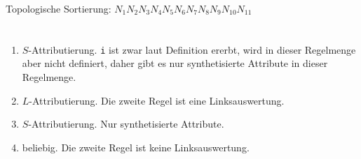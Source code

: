 \documentclass[a4paper,10pt]{scrartcl}
\begin{document}
\begin{enumerate}
\begin{center}
{{{{                            
                        }
                    }
                }
                \Tr{$+$}
            }
        \end{center}
        Topologische Sortierung: $N_1N_2N_3N_4N_5N_6N_7N_8N_9N_{10}N_{11}$
\end{enumerate}

\section{}
\begin{enumerate}
\item   $S$-Attributierung. \texttt{i} ist zwar laut Definition ererbt, wird in dieser Regelmenge aber nicht definiert, daher gibt es nur synthetisierte Attribute in dieser Regelmenge.
\item   $L$-Attributierung. Die zweite Regel ist eine Linksauswertung.
\item   $S$-Attributierung. Nur synthetisierte Attribute.
\item   beliebig. Die zweite Regel ist keine Linksauswertung.
\end{enumerate}

\section{}
\end{document}
